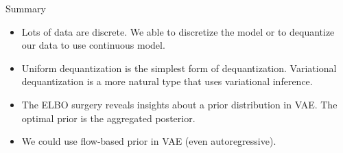 \begin{frame}{Summary}
	\begin{itemize}
		\item Lots of data are discrete. We able to discretize the model or to dequantize our data to use continuous model.
		\vfill
		\item Uniform dequantization is the simplest form of dequantization. Variational dequantization is a more natural type that uses variational inference.
		\vfill
		\item The ELBO surgery reveals insights about a prior distribution in VAE. The optimal prior is the aggregated posterior.
		\vfill
		\item We could use flow-based prior in VAE (even autoregressive).
	\end{itemize}
\end{frame}

 
